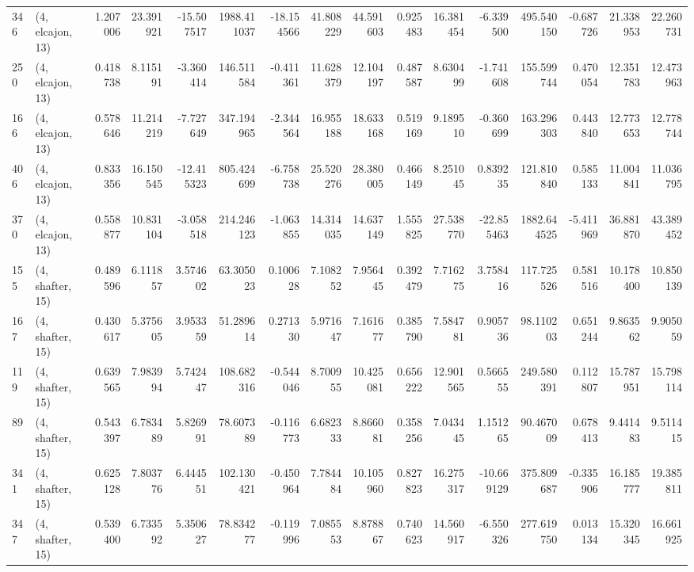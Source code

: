 \begin{tabular}{llrrrrrrrrrrrrrr}
346 &  (4, elcajon, 13) &   1.207006 &  23.391921 & -15.507517 &  1988.411037 & -18.154566 &  41.808229 &  44.591603 &  0.925483 &  16.381454 &  -6.339500 &   495.540150 &  -0.687726 &  21.338953 &  22.260731 \\
250 &  (4, elcajon, 13) &   0.418738 &   8.115191 &  -3.360414 &   146.511584 &  -0.411361 &  11.628379 &  12.104197 &  0.487587 &   8.630499 &  -1.741608 &   155.599744 &   0.470054 &  12.351783 &  12.473963 \\
166 &  (4, elcajon, 13) &   0.578646 &  11.214219 &  -7.727649 &   347.194965 &  -2.344564 &  16.955188 &  18.633168 &  0.519169 &   9.189510 &  -0.360699 &   163.296303 &   0.443840 &  12.773653 &  12.778744 \\
406 &  (4, elcajon, 13) &   0.833356 &  16.150545 & -12.415323 &   805.424699 &  -6.758738 &  25.520276 &  28.380005 &  0.466149 &   8.251045 &   0.839235 &   121.810840 &   0.585133 &  11.004841 &  11.036795 \\
370 &  (4, elcajon, 13) &   0.558877 &  10.831104 &  -3.058518 &   214.246123 &  -1.063855 &  14.314035 &  14.637149 &  1.555825 &  27.538770 & -22.855463 &  1882.644525 &  -5.411969 &  36.881870 &  43.389452 \\
155 &  (4, shafter, 15) &   0.489596 &   6.111857 &   3.574602 &    63.305023 &   0.100628 &   7.108252 &   7.956445 &  0.392479 &   7.716275 &   3.758416 &   117.725526 &   0.581516 &  10.178400 &  10.850139 \\
167 &  (4, shafter, 15) &   0.430617 &   5.375605 &   3.953359 &    51.289614 &   0.271330 &   5.971647 &   7.161677 &  0.385790 &   7.584781 &   0.905736 &    98.110203 &   0.651244 &   9.863562 &   9.905059 \\
119 &  (4, shafter, 15) &   0.639565 &   7.983994 &   5.742447 &   108.682316 &  -0.544046 &   8.700955 &  10.425081 &  0.656222 &  12.901565 &   0.566555 &   249.580391 &   0.112807 &  15.787951 &  15.798114 \\
89  &  (4, shafter, 15) &   0.543397 &   6.783489 &   5.826991 &    78.607389 &  -0.116773 &   6.682333 &   8.866081 &  0.358256 &   7.043445 &   1.151265 &    90.467009 &   0.678413 &   9.441483 &   9.511415 \\
341 &  (4, shafter, 15) &   0.625128 &   7.803776 &   6.444551 &   102.130421 &  -0.450964 &   7.784484 &  10.105960 &  0.827823 &  16.275317 & -10.669129 &   375.809687 &  -0.335906 &  16.185777 &  19.385811 \\
347 &  (4, shafter, 15) &   0.539400 &   6.733592 &   5.350627 &    78.834277 &  -0.119996 &   7.085553 &   8.878867 &  0.740623 &  14.560917 &  -6.550326 &   277.619750 &   0.013134 &  15.320345 &  16.661925 \\

\end{tabular}
